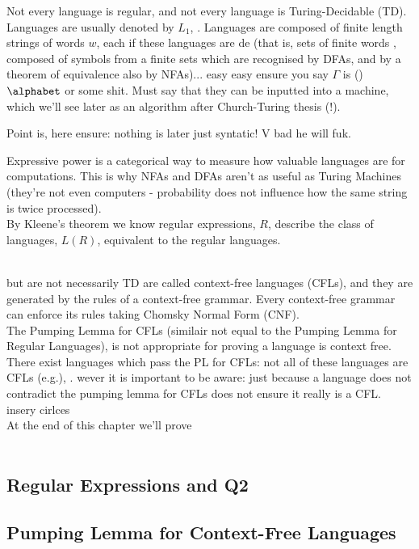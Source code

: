 \documentclass{article}
\theoremstyle{mydef}
\theoremstyle{mythm}
\theoremstyle{mylemming}
\theoremstyle{myq}
\begin{document}
Not every language is regular, and not every language is Turing-Decidable (TD). Languages are usually denoted by $L_{1}$, . Languages are composed of finite length strings of words $w$, each if these languages are de (that is, sets of finite words , composed of symbols from a finite sets which are recognised by DFAs, and by a theorem of equivalence also by NFAs)... easy easy ensure you say $\Gamma$ is ()$\alphabet$ or some shit. Must say that they can be inputted into a machine, which we'll see later as an algorithm after Church-Turing thesis (!).


Point is, here ensure: nothing is later just syntatic! V bad he will fuk.

Expressive power is a categorical way to measure how valuable languages are for computations. This is why NFAs and DFAs aren't as useful as Turing Machines (they're not even computers - probability does not influence how the same string is twice processed). 
\\
By Kleene's theorem we know regular expressions, $R$, describe the class of languages, $L(R)$, equivalent to the regular languages. 

\\but are not necessarily TD are called context-free languages (CFLs), and they are generated by the rules of a context-free grammar. Every context-free grammar can enforce its rules taking Chomsky Normal Form (CNF). 
\\
The Pumping Lemma for CFLs (similair not equal to the Pumping Lemma for Regular Languages), is not appropriate for proving a language is context free. There exist languages which pass the PL for CFLs: not all of these languages are CFLs (e.g.), . wever it is important to be aware: just because a language does not contradict the pumping lemma for CFLs does not ensure it really is a CFL.
\\
insery cirlces
\\
At the end of this chapter we'll prove \\
\qone
\\
\subsection{Regular Expressions and Q2}
\thmequiv

{}
\qtwo
\prooftwo

{}
\thmarmstrong

\subsection{Pumping Lemma for Context-Free Languages}
\end{document}
